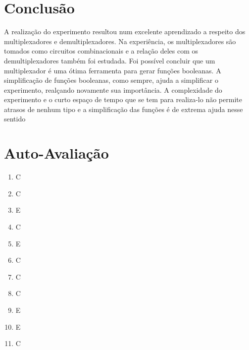 \documentclass[12pt]{article}
\begin{document}
\section{Conclusão}
\label{sec:Conclusao}

A realização do experimento resultou num excelente aprendizado a respeito dos multiplexadores e demultiplexadores. Na experiência, os multiplexadores são tomados como circuitos combinacionais e a relação deles com os demultiplexadores também foi estudada.
Foi possível concluir que um multiplexador é uma ótima ferramenta para gerar funções booleanas. A simplificação de funções booleanas, como sempre, ajuda a simplificar o experimento, realçando novamente sua importância. A complexidade do experimento e o curto espaço de tempo que se tem para realiza-lo não permite atrasos de nenhum tipo e a simplificação das funções é de extrema ajuda nesse sentido

\newpage 
\section*{Auto-Avaliação}

\begin{enumerate}
    \item C
    \item C
    \item E
    \item C
    \item E
    \item C
    \item C
    \item C
    \item E
    \item E
    \item C
\end{enumerate}
\end{document}

